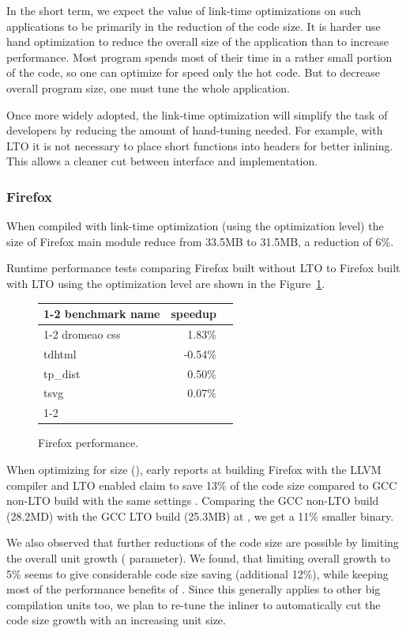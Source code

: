 \documentclass[final]{ols}
\begin{document}
In the short term, we expect the value of link-time optimizations on such
applications to be primarily in the reduction of the code size.  It is harder
use hand optimization to reduce the overall size of the application than to
increase performance. Most program spends most of their time in a rather small
portion of the code, so one can optimize for speed only the hot code.  But to
decrease overall program size, one must tune the whole application.

Once more widely adopted, the link-time optimization will simplify the task of
developers by reducing the amount of hand-tuning needed.  For example, with LTO
it is not necessary to place short functions into headers for better inlining.
This allows a cleaner cut between interface and implementation.

\subsubsection{Firefox}

When compiled with link-time optimization (using the  optimization
level) the size of Firefox main module reduce from 33.5MB to
31.5MB, a reduction of 6\%. 

Runtime performance tests comparing Firefox built without LTO to
Firefox built with LTO using the  optimization level are shown
in the Figure~\ref{Firefox}.
\begin{figure}[t]
\begin{center}
\begin{tabular}{|l|r|l|}
\cline{1-2}
benchmark name & speedup \\
\cline{1-2}
dromeao css & 1.83\% \\
tdhtml & -0.54\% \\
tp\_dist & 0.50\% \\
tsvg & 0.07\% \\
\cline{1-2}
\end{tabular}
\end{center}
  \caption{Firefox performance.}
\label{Firefox}
\end{figure}

When optimizing for size (),  early reports at building Firefox  with
the LLVM compiler and LTO enabled claim to save 13\% of the code size
compared to GCC non-LTO build with the same settings \cite{Rafael}. Comparing the GCC
non-LTO build (28.2MD) with the GCC LTO build (25.3MB) at
, we get a 11\% smaller binary.  

We also observed that further reductions of the code size are possible by
limiting the overall unit growth ( parameter).
We found, that limiting overall growth to 5\% seems to give considerable
code size saving (additional 12\%), while keeping most of the performance benefits of
. Since this generally applies to other big compilation units too, we
plan to re-tune the inliner to automatically cut the code size growth with 
an increasing unit size.
\end{document}
